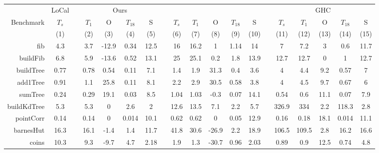 \documentclass[showabstract,showacknowledgments,showpreface,showdedication,school]{iuphd}
\theoremstyle{nonumberplain}
\newcommand{\MPL}{\text{MaPLe}}
\begin{document}
\begin{figure}
  \footnotesize
  \centering
  \setlength{\tabcolsep}{0.4em}
  \begin{tabular}{@{}r cc cccc r ccccc r ccccc@{}}
    \toprule
    & LoCal & \phantom{} & \multicolumn{4}{c}{Ours} & \phantom{} & \multicolumn{5}{c}{\MPL{}} & \phantom{} & \multicolumn{5}{c}{GHC} \\
    \cmidrule{2-2}
    \cmidrule{4-7}
    \cmidrule{9-13}
    \cmidrule{15-19}
    Benchmark & $T_s$ && $T_1$ & O & $T_{18}$ & S && $T_s$ & $T_1$ & O & $T_{18}$ & S && $T_s$ & $T_1$ & O & $T_{18}$ & S \\
    & (1) && (2) & (3) & (4) & (5) && (6) & (7) & (8) & (9) & (10) && (11) & (12) & (13) & (14) & (15) \\
    \midrule

    fib & 4.3 && 3.7 & -12.9 & 0.34 & 12.5 && 16 & 16.2 & 1 & 1.14 & 14 && 7 & 7.2 & 3 & 0.6 & 11.7 \\

    buildFib  & 6.8 && 5.9 & -13.6 & 0.52 & 13.1 && 25 & 25.1 & 0.2 & 1.8 & 13.9 && 12.7 & 12.7 & 0 & 1 & 12.7 \\

    buildTree & 0.77 && 0.78 & 0.54 & 0.11 & 7.1 && 1.4 & 1.9 & 31.3 & 0.4 & 3.6 && 4 & 4.4 & 9.2 & 0.57 & 7 \\

    add1Tree & 0.91 && 1.1 & 25.8 & 0.11 & 8.1 && 2.2 & 2.9 & 30.5 & 0.58 & 3.8 && 4 & 4.5 & 9.7 & 0.67 & 6 \\

    sumTree & 0.24 && 0.29 & 19.1 & 0.03 & 8.5 && 1.04 & 1.03 & -0.3 & 0.07 & 14.1 && 0.54 & 0.6 & 11.1 & 0.07 & 7.9 \\

    buildKdTree & 5.3 && 5.3 & 0 & 2.6 & 2 && 12.6 & 13.5 & 7.1 & 2.2 & 5.7 && 326.9 & 334 & 2.2 & 118.3 & 2.8 \\

    pointCorr & 0.14 && 0.14 & 0 & 0.014 & 10.1 && 0.62 & 0.62 & 0 & 0.05 & 12.9 && 0.16 & 0.18 & 18.1 & 0.014 & 11.1 \\

    barnesHut & 16.3 && 16.1 & -1.4 & 1.4 & 11.7 && 41.8 & 30.6 & -26.9 & 2.2 & 18.9 && 106.5 & 109.5 & 2.8 & 16.2 & 16.6 \\

    coins & 10.3 && 9.3 & -9.7 & 4.7 & 2.18 && 1.9 & 1.3 & -30.7 & 0.96 & 2.03 && 0.89 & 0.9 & 12.5 & 0.74 & 4.8 \\


\end{tabular}
\end{figure}
\end{document}
